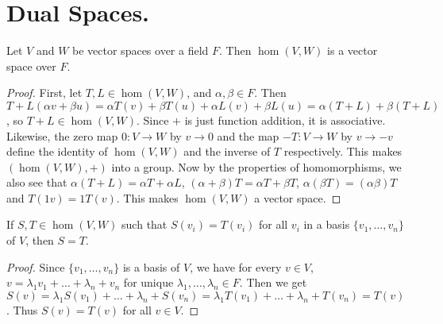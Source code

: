 
\section{Dual Spaces.}
\label{section1}

\begin{lemma}
    Let $V$ and  $W$ be vector spaces over a field  $F$. Then  $\hom(V,W)$ is a
    vector space over $F$.
\end{lemma}
\begin{proof}
    First, let $T,L \in \hom(V,W)$, and $\alpha, \beta \in F$. Then  $T+L(\alpha
    v+ \beta u)=\alpha T(v)+\beta T(u)+\alpha L(v)+\beta
    L(u)=\alpha(T+L)+\beta(T+L)$, so $T+L \in \hom(V,W)$. Since $+$ is just
    function addition, it is associative. Likewise, the zero map  $0:V
    \rightarrow W$ by $v \rightarrow 0$ and the map $-T:V \rightarrow W$ by $v
    \rightarrow -v$ define the identity of $\hom(V,W)$ and the inverse of $T$
    respectively. This makes  $(\hom(V,W),+)$ into a group. Now by the
    properties of homomorphisms, we also see that $\alpha(T+L)=\alpha T+\alpha
    L$, $(\alpha+\beta)T=\alpha T+\beta T$, $\alpha(\beta T)=(\alpha\beta)T$ and
    $T(1v)=1T(v)$. This makes $\hom(V,W)$ a vector space.
\end{proof}

\begin{lemma}
    If $S,T \in \hom(V,W)$ such that $S(v_i)=T(v_i)$ for all $v_i$ in a basis
    $\{v_1, \dots, v_n\}$ of $V$, then  $S=T$.
\end{lemma}
\begin{proof}
    Since $\{v_1, \dots, v_n\}$ is a basis of $V$, we have for every  $v \in V$,
     $v=\lambda_1v_1+\dots+\lambda_n+v_n$ for unique $\lambda_1, \dots,
     \lambda_n \in F$. Then we get
     $S(v)=\lambda_1S(v_1)+\dots+\lambda_n+S(v_n)=\lambda_1T(v_1)+\dots+\lambda_n+T(v_n)=T(v)$.
     Thus $S(v)=T(v)$ for all $v \in V$.
\end{proof}

